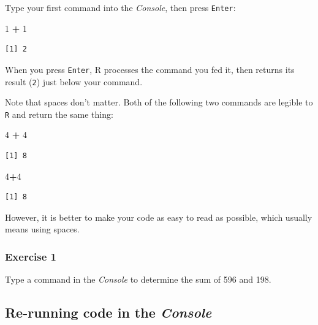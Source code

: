\documentclass[
]{book}
\newenvironment{Shaded}{\begin{snugshade}}{\end{snugshade}}
\newcommand{\DecValTok}[1]{\textcolor[rgb]{0.00,0.00,0.81}{#1}}
\newcommand{\OperatorTok}[1]{\textcolor[rgb]{0.81,0.36,0.00}{\textbf{#1}}}
\newcommand{\StringTok}[1]{\textcolor[rgb]{0.31,0.60,0.02}{#1}}
\begin{document}
Type your first command into the \emph{Console}, then press \texttt{Enter}:

\begin{Shaded}
\begin{Highlighting}[]
\DecValTok{1} \OperatorTok{+}\StringTok{ }\DecValTok{1}
\end{Highlighting}
\end{Shaded}

\begin{verbatim}
[1] 2
\end{verbatim}

When you press \texttt{Enter}, R processes the command you fed it, then returns its result (\texttt{2}) just below your command.

Note that spaces don't matter. Both of the following two commands are legible to \texttt{R} and return the same thing:

\begin{Shaded}
\begin{Highlighting}[]
\DecValTok{4} \OperatorTok{+}\StringTok{ }\DecValTok{4}
\end{Highlighting}
\end{Shaded}

\begin{verbatim}
[1] 8
\end{verbatim}

\begin{Shaded}
\begin{Highlighting}[]
\DecValTok{4}\OperatorTok{+}\DecValTok{4}
\end{Highlighting}
\end{Shaded}

\begin{verbatim}
[1] 8
\end{verbatim}

However, it is better to make your code as easy to read as possible, which usually means using spaces.

\hypertarget{exercise-1}{%
\subsubsection*{Exercise 1}\label{exercise-1}}

Type a command in the \emph{Console} to determine the sum of 596 and 198.

\hypertarget{re-running-code-in-the-console}{%
\subsection*{\texorpdfstring{Re-running code in the \emph{Console}}{Re-running code in the Console}}\label{re-running-code-in-the-console}}
\end{document}
